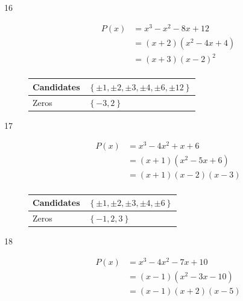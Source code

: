\documentclass{exam}
\begin{document}
\begin{description}
        \vspace{.5 cm}

      \item[16]
        \begin{align*}
          P(x) &= x^3 - x^2 - 8x + 12 \\
               &= (x + 2)(x^2 - 4x + 4) \\
               &= (x + 3)(x - 2)^2 \\
        \end{align*}

        \begin{tabular}{ll}
          \toprule
          Candidates & $\left\{ \pm 1, \pm 2, \pm 3, \pm 4, \pm 6, \pm 12 \right\}$ \\
          \midrule
          Zeros      & $\left\{ -3, 2 \right\}$ \\
          \bottomrule
        \end{tabular}

        \vspace{.5 cm}

      \item[17]
        \begin{align*}
          P(x) &= x^3 - 4x^2 + x + 6 \\
               &= (x + 1)(x^2 - 5x + 6) \\
               &= (x + 1)(x - 2)(x - 3) \\
        \end{align*}

        \begin{tabular}{ll}
          \toprule
          Candidates & $\left\{ \pm 1, \pm 2, \pm 3, \pm 4, \pm 6 \right\}$ \\
          \midrule
          Zeros      & $\left\{ -1, 2, 3 \right\}$ \\
          \bottomrule
        \end{tabular}

        \vspace{.5 cm}

      \item[18]
        \begin{align*}
          P(x) &= x^3 - 4x^2 - 7x + 10 \\
               &= (x - 1)(x^2 - 3x - 10) \\
               &= (x - 1)(x + 2)(x - 5) \\
        \end{align*}


\end{description}
\end{document}

